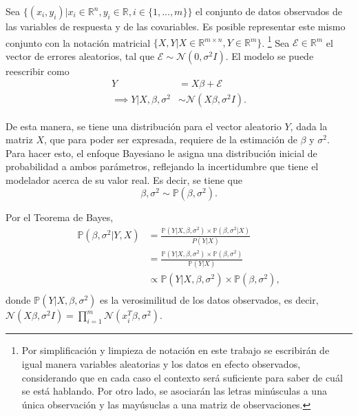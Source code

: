 Sea $\{(x_i,y_i)| x_i \in \mathbb{R}^n, y_i \in \mathbb{R}, i \in \{1,...,m\} \}$ el conjunto de datos observados de las variables de respuesta y de las covariables. Es posible representar este mismo conjunto con la notaci\'on matricial $\{X,Y | X \in \mathbb{R}^{m \times n}, Y \in \mathbb{R}^m\}$. \footnote{Por simplificaci\'on y limpieza de notaci\'on en este trabajo se escribir\'an de igual manera variables aleatorias y los datos en efecto observados, considerando que en cada caso el contexto ser\'a suficiente para saber de cu\'al se est\'a hablando. Por otro lado, se asociar\'an las letras min\'usculas a una \'unica observaci\'on y las may\'usuclas a una matriz de observaciones.} Sea $\mathcal{E} \in \mathbb{R}^m$ el vector de errores aleatorios, tal que $\mathcal{E} \sim \mathcal{N}(0,\sigma^2 I)$. El modelo se puede reescribir como
\begin{equation*}
\begin{aligned}
    Y &= X\beta + \mathcal{E} \\
    \implies Y|X,\beta,\sigma^2 &\sim \mathcal{N}(X\beta,\sigma^2 I).
\end{aligned}
\end{equation*}

De esta manera, se tiene una distribuci\'on para el vector aleatorio $Y$, dada la matriz $X$, que para poder ser expresada, requiere de la estimaci\'on de $\beta$ y $\sigma^2$. Para hacer esto, el enfoque Bayesiano le asigna una distribución inicial de probabilidad a ambos par\'ametros, reflejando la incertidumbre que tiene el modelador acerca de su valor real. Es decir, se tiene que 
\begin{equation*}
    \beta,\sigma^2 \sim \mathbb{P}(\beta,\sigma^2).
\end{equation*}

Por el Teorema de Bayes,
\begin{equation*}
\begin{aligned}
    \mathbb{P}(\beta,\sigma^2 | Y, X) 
    &= \frac{\mathbb{P}(Y| X, \beta, \sigma^2) \times \mathbb{P}(\beta, \sigma^2 | X)}{P(Y | X)} \\
    &= \frac{\mathbb{P}(Y| X, \beta, \sigma^2) \times \mathbb{P}(\beta, \sigma^2)}{\mathbb{P}(Y | X)} \\
    &\propto \mathbb{P}(Y| X, \beta, \sigma^2) \times \mathbb{P}(\beta, \sigma^2), \\
\end{aligned}
\end{equation*}
donde $\mathbb{P}(Y| X, \beta, \sigma^2)$ es la verosimilitud de los datos observados, es decir, $ \mathcal{N}(X\beta,\sigma^2 I) = \prod_{i=1}^m \mathcal{N}(x_i^T\beta,\sigma^2)$. 

